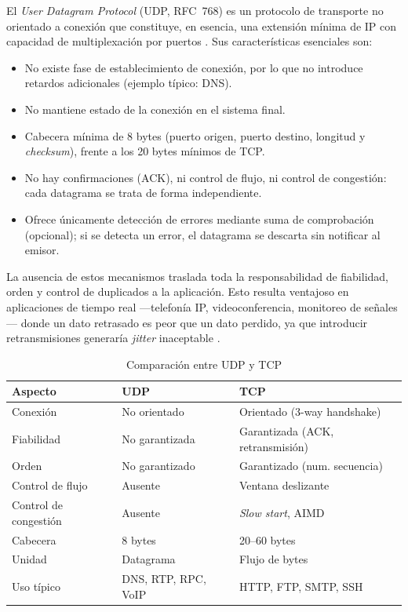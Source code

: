 \documentclass[conference]{IEEEtran}
\begin{document}
El \emph{User Datagram Protocol} (UDP, RFC~768) es un protocolo de transporte no orientado a conexión que constituye, en esencia, una extensión mínima de IP con capacidad de multiplexación por puertos \cite{fuoc}. Sus características esenciales son:

\begin{itemize}
    \item No existe fase de establecimiento de conexión, por lo que no introduce retardos adicionales (ejemplo típico: DNS).
    \item No mantiene estado de la conexión en el sistema final.
    \item Cabecera mínima de 8 bytes (puerto origen, puerto destino, longitud y \textit{checksum}), frente a los 20 bytes mínimos de TCP.
    \item No hay confirmaciones (ACK), ni control de flujo, ni control de congestión: cada datagrama se trata de forma independiente.
    \item Ofrece únicamente detección de errores mediante suma de comprobación (opcional); si se detecta un error, el datagrama se descarta sin notificar al emisor.
\end{itemize}

La ausencia de estos mecanismos traslada toda la responsabilidad de fiabilidad, orden y control de duplicados a la aplicación. Esto resulta ventajoso en aplicaciones de tiempo real —telefonía IP, videoconferencia, monitoreo de señales— donde un dato retrasado es peor que un dato perdido, ya que introducir retransmisiones generaría \textit{jitter} inaceptable \cite{fuoc}.

\begin{table}[htbp]
\caption{Comparación entre UDP y TCP}
\label{tab:comparacion}
\centering
\begin{tabular}{|p{1.6cm}|p{2.7cm}|p{2.7cm}|}
\hline
\textbf{Aspecto} & \textbf{UDP} & \textbf{TCP} \\
\hline
Conexión & No orientado & Orientado (3-way handshake) \\
\hline
Fiabilidad & No garantizada & Garantizada (ACK, retransmisión) \\
\hline
Orden & No garantizado & Garantizado (num. secuencia) \\
\hline
Control de flujo & Ausente & Ventana deslizante \\
\hline
Control de congestión & Ausente & \textit{Slow start}, AIMD \\
\hline
Cabecera & 8 bytes & 20--60 bytes \\
\hline
Unidad & Datagrama & Flujo de bytes \\
\hline
Uso típico & DNS, RTP, RPC, VoIP & HTTP, FTP, SMTP, SSH \\
\hline
\end{tabular}
\end{table}
\end{document}
